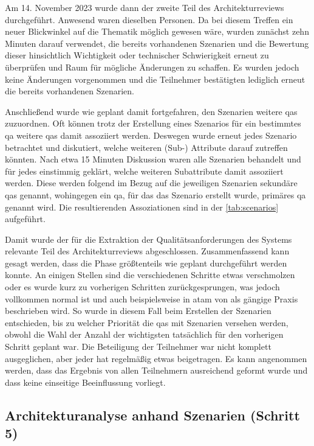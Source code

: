 Am 14. November 2023 wurde dann der zweite Teil des Architekturreviews durchgeführt.
Anwesend waren dieselben Personen.
Da bei diesem Treffen ein neuer Blickwinkel auf die Thematik möglich gewesen wäre, wurden zunächst zehn Minuten darauf verwendet, die bereits vorhandenen Szenarien und die Bewertung dieser hinsichtlich Wichtigkeit oder technischer Schwierigkeit erneut zu überprüfen und Raum für mögliche Änderungen zu schaffen.
Es wurden jedoch keine Änderungen vorgenommen und die Teilnehmer bestätigten lediglich erneut die bereits vorhandenen Szenarien.

Anschließend wurde wie geplant damit fortgefahren, den Szenarien weitere \glspl{qa} zuzuordnen.
Oft können trotz der Erstellung eines Szenarios für ein bestimmtes \gls{qa} weitere \glspl{qa} damit assoziiert werden.
Deswegen wurde erneut jedes Szenario betrachtet und diskutiert, welche weiteren (Sub-) Attribute darauf zutreffen könnten.
Nach etwa 15 Minuten Diskussion waren alle Szenarien behandelt und für jedes einstimmig geklärt, welche weiteren Subattribute damit assoziiert werden.
Diese werden folgend im Bezug auf die jeweiligen Szenarien sekundäre \glspl{qa} genannt, wohingegen ein \gls{qa}, für das das Szenario erstellt wurde, primäres \gls{qa} genannt wird.
Die resultierenden Assoziationen sind in der \cref{tab:scenarios} aufgeführt.



Damit wurde der für die Extraktion der Qualitätsanforderungen des Systems relevante Teil des Architekturreviews abgeschlossen.
Zusammenfassend kann gesagt werden, dass die Phase größtenteils wie geplant durchgeführt werden konnte.
An einigen Stellen sind die verschiedenen Schritte etwas verschmolzen oder es wurde kurz zu vorherigen Schritten zurückgesprungen, was jedoch vollkommen normal ist und auch beispielsweise in \gls{atam} von  als gängige Praxis beschrieben wird.
So wurde in diesem Fall beim Erstellen der Szenarien entschieden, bis zu welcher Priorität die \glspl{qa} mit Szenarien versehen werden, obwohl die Wahl der Anzahl der wichtigsten tatsächlich für den vorherigen Schritt geplant war.
Die Beteiligung der Teilnehmer war nicht komplett ausgeglichen, aber jeder hat regelmäßig etwas beigetragen.
Es kann angenommen werden, dass das Ergebnis von allen Teilnehmern ausreichend geformt wurde und dass keine einseitige Beeinflussung vorliegt.

\subsection{Architekturanalyse anhand Szenarien (Schritt 5)}

